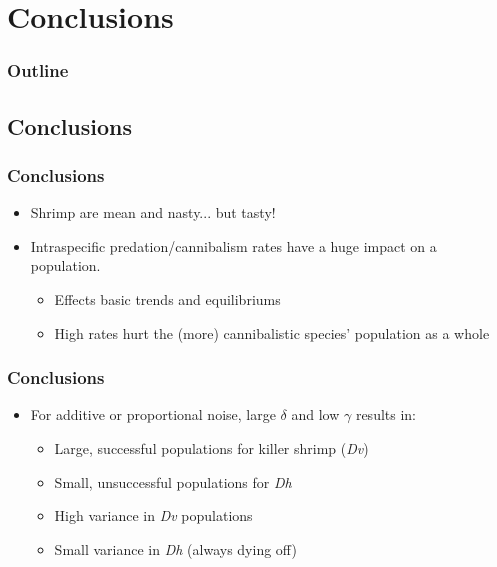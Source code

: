 \section{Conclusions}


\begin{frame}
  \frametitle{Outline}
  \tableofcontents[ currentsection ]
\end{frame}

\subsection{Conclusions}

\begin{frame}
  \frametitle{Conclusions}
\vfill
\begin{itemize}
	\item Shrimp are mean and nasty... but tasty!
			\vfill
	\item Intraspecific predation/cannibalism rates have a huge impact on a population.
			\vfill
	\begin{itemize}
		\item Effects basic trends and equilibriums
			\vfill
		\item High rates hurt the (more) cannibalistic species' population as a whole
	\end{itemize}
			\vfill
\end{itemize}
  
\end{frame}

\begin{frame}
  \frametitle{Conclusions}
\vfill

\begin{itemize}
	\item For additive or proportional noise, large $\delta$ and low $\gamma$ results in:
	\begin{itemize}
		\item Large, successful populations for killer shrimp (\textit{Dv})
			\vfill
		\item Small, unsuccessful populations for \textit{Dh}
			\vfill
		\item High variance in \textit{Dv} populations
			\vfill
		\item Small variance in \textit{Dh} (always dying off)
	\end{itemize}
\vfill
\end{itemize}

\end{frame}